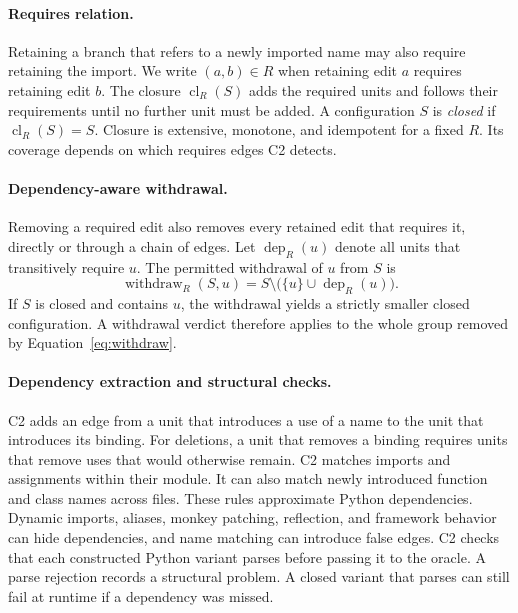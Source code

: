 \documentclass[a4paper,fleqn]{cas-sc}
\newcommand{\cl}{\operatorname{cl}}
\newcommand{\withdraw}{\operatorname{withdraw}}
\begin{document}
\paragraph{Requires relation.} Retaining a branch that refers to a newly imported name may also require retaining the import. We write $(a,b)\in R$ when retaining edit $a$ requires retaining edit $b$. The closure $\cl_R(S)$ adds the required units and follows their requirements until no further unit must be added. A configuration $S$ is \emph{closed} if $\cl_R(S)=S$. Closure is extensive, monotone, and idempotent for a fixed $R$. Its coverage depends on which requires edges C2 detects.

\paragraph{Dependency-aware withdrawal.} Removing a required edit also removes every retained edit that requires it, directly or through a chain of edges. Let $\operatorname{dep}_R(u)$ denote all units that transitively require $u$. The permitted withdrawal of $u$ from $S$ is
\begin{equation}
\withdraw_R(S,u)=S\setminus\bigl(\{u\}\cup\operatorname{dep}_R(u)\bigr).
\label{eq:withdraw}
\end{equation}
If $S$ is closed and contains $u$, the withdrawal yields a strictly smaller closed configuration. A withdrawal verdict therefore applies to the whole group removed by Equation~\ref{eq:withdraw}.

\paragraph{Dependency extraction and structural checks.} C2 adds an edge from a unit that introduces a use of a name to the unit that introduces its binding. For deletions, a unit that removes a binding requires units that remove uses that would otherwise remain. C2 matches imports and assignments within their module. It can also match newly introduced function and class names across files. These rules approximate Python dependencies. Dynamic imports, aliases, monkey patching, reflection, and framework behavior can hide dependencies, and name matching can introduce false edges. C2 checks that each constructed Python variant parses before passing it to the oracle. A parse rejection records a structural problem. A closed variant that parses can still fail at runtime if a dependency was missed.
\end{document}
